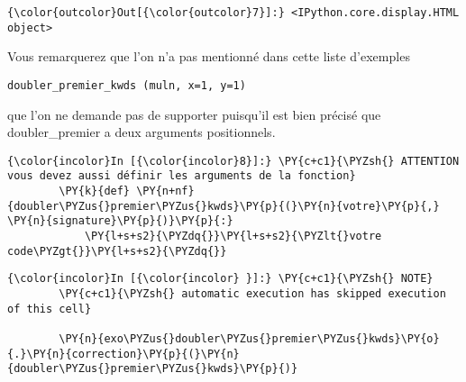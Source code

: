 \begin{Verbatim}[commandchars=\\\{\}]
{\color{outcolor}Out[{\color{outcolor}7}]:} <IPython.core.display.HTML object>
\end{Verbatim}
            
    Vous remarquerez que l'on n'a pas mentionné dans cette liste d'exemples

\begin{verbatim}
doubler_premier_kwds (muln, x=1, y=1)
\end{verbatim}

que l'on ne demande pas de supporter puisqu'il est bien précisé que
doubler\_premier a deux arguments positionnels.

    \begin{Verbatim}[commandchars=\\\{\}]
{\color{incolor}In [{\color{incolor}8}]:} \PY{c+c1}{\PYZsh{} ATTENTION vous devez aussi définir les arguments de la fonction}
        \PY{k}{def} \PY{n+nf}{doubler\PYZus{}premier\PYZus{}kwds}\PY{p}{(}\PY{n}{votre}\PY{p}{,} \PY{n}{signature}\PY{p}{)}\PY{p}{:}
            \PY{l+s+s2}{\PYZdq{}}\PY{l+s+s2}{\PYZlt{}votre code\PYZgt{}}\PY{l+s+s2}{\PYZdq{}}
\end{Verbatim}


    \begin{Verbatim}[commandchars=\\\{\}]
{\color{incolor}In [{\color{incolor} }]:} \PY{c+c1}{\PYZsh{} NOTE}
        \PY{c+c1}{\PYZsh{} automatic execution has skipped execution of this cell}
        
        \PY{n}{exo\PYZus{}doubler\PYZus{}premier\PYZus{}kwds}\PY{o}{.}\PY{n}{correction}\PY{p}{(}\PY{n}{doubler\PYZus{}premier\PYZus{}kwds}\PY{p}{)}
\end{Verbatim}



    
    
    

